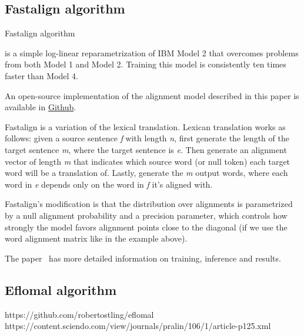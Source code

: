 \subsection{Fastalign algorithm}

Fastalign algorithm~\cite{dyer-etal-2013-simple}

is a simple log-linear reparametrization of IBM Model 2 that overcomes problems from both Model 1 and Model 2. Training this model is consistently ten times faster than Model 4.

An open-source implementation of the alignment model described in this paper is available in \href{http://github.com/clab/fast align}{Github}.

Fastalign is a variation of the lexical translation. Lexican translation works as follows: given a source sentence \emph{f} with length \emph{n}, first generate the length of the target sentence \emph{m}, where the target sentence is \emph{e}. Then generate an alignment vector of length \emph{m} that indicates which source word (or null token) each target word will be a translation of. Lastly, generate the \emph{m} output words, where each word in \emph{e} depends only on the word in \emph{f} it's aligned with.

Fastalign's modification is that the distribution over alignments is parametrized by a null alignment probability and a precision parameter, which controls how strongly the model favors alignment points close to the diagonal (if we use the word alignment matrix like in the example above).

The paper~\cite{dyer-etal-2013-simple} has more detailed information on training, inference and results.

\subsection{Eflomal algorithm}

https://github.com/robertostling/eflomal
https://content.sciendo.com/view/journals/pralin/106/1/article-p125.xml
